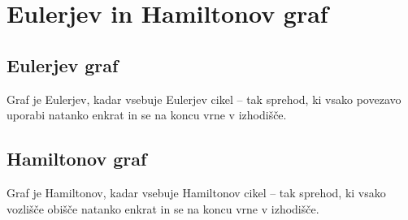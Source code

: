 \documentclass[10pt,a4paper,oneside]{book}
\begin{document}
\section{Eulerjev in Hamiltonov graf}
\subsection{Eulerjev graf}
Graf je Eulerjev, kadar vsebuje Eulerjev cikel -- tak sprehod, ki vsako povezavo uporabi natanko enkrat in se na koncu vrne v izhodišče. 


\subsection{Hamiltonov graf}
Graf je Hamiltonov, kadar vsebuje Hamiltonov cikel -- tak sprehod, ki vsako vozlišče obišče natanko enkrat in se na koncu vrne v izhodišče.
\end{document}
